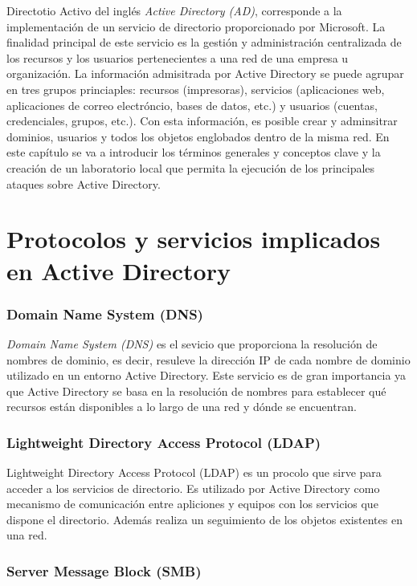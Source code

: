 Directotio Activo del inglés {\it Active Directory (AD)}, corresponde a la implementación de un servicio de directorio proporcionado por Microsoft. La finalidad principal de este servicio es la gestión y administración centralizada de los recursos y los usuarios pertenecientes a una red de una empresa u organización. La in\-for\-ma\-ción admisitrada por Active Directory se puede agrupar en tres grupos princiaples: recursos (impresoras), servicios (aplicaciones web, aplicaciones de correo electróncio, bases de datos, etc.) y usuarios (cuentas, credenciales, grupos, etc.). Con esta in\-for\-ma\-ción, es posible crear y adminsitrar dominios, usuarios y todos los objetos englobados dentro de la misma red. En este capítulo se va a introducir los términos generales y conceptos clave y la creación de un laboratorio local que permita la ejecución de los principales ataques sobre Active Directory.

\section{Protocolos y servicios implicados en Active Directory}

\subsubsection{Domain Name System (DNS)}

{\it Domain Name System (DNS)} es el sevicio que proporciona la resolución de nombres de dominio, es decir, resuleve la dirección IP de cada nombre de dominio utilizado en un entorno Active Directory. Este servicio es de gran importancia ya que Active Directory se basa en la resolución de nombres para establecer qué recursos están disponibles a lo largo de una red y dónde se encuentran. 


\subsubsection{Lightweight Directory Access Protocol (LDAP)}

{Lightweight Directory Access Protocol (LDAP)} es un procolo que sirve para acceder a los servicios de directorio. Es utilizado por Active Directory como mecanismo de comunicación entre apliciones y equipos con los servicios que dispone el directorio. Además realiza un seguimiento de los objetos existentes en una red. 


\subsubsection{Server Message Block (SMB)}

